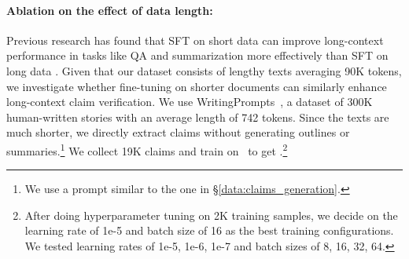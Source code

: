 \paragraph{Ablation on the effect of data length:}
Previous research has found that SFT on short data can improve long-context performance in tasks like QA and summarization more effectively than SFT on long data \cite{dubey2024llama, gao2024trainlongcontextlanguagemodels}. Given that our dataset consists of lengthy texts averaging 90K tokens, we investigate whether fine-tuning on shorter documents can similarly enhance long-context claim verification. We use WritingPrompts~\cite{fan-etal-2018-hierarchical}, a dataset of 300K human-written stories with an average length of 742 tokens. Since the texts are much shorter, we directly extract claims without generating outlines or summaries.\footnote{We use a prompt similar to the one in \S\ref{data:claims_generation}.} We collect 19K claims and train on \prolongbase\ to get \prolongwp.\footnote{After doing hyperparameter tuning on 2K training samples, we decide on the learning rate of 1e-5 and batch size of 16 as the best training configurations. We tested learning rates of 1e-5, 1e-6, 1e-7 and batch sizes of 8, 16, 32, 64.}


